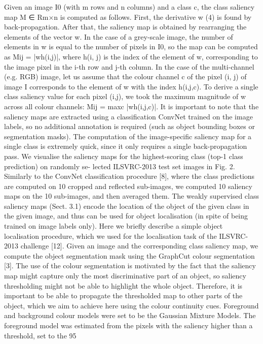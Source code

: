 Given an image I0 (with m rows and n columns) and a class c, the class saliency map M ∈ Rm×n is computed as follows. First, the derivative w (4) is found by back-propagation. After that, the saliency map is obtained by rearranging the elements of the vector w. In the case of a grey-scale image, the number of elements in w is equal to the number of pixels in I0, so the map can be computed as Mij = |wh(i,j)|, where h(i, j) is the index of the element of w, corresponding to the image pixel in the i-th row and j-th column. In the case of the multi-channel (e.g. RGB) image, let us assume that the colour channel c of the pixel (i, j) of image I corresponds to the element of w with the index h(i,j,c). To derive a single class saliency value for each pixel (i,j), we took the maximum magnitude of w across all colour channels: Mij = maxc |wh(i,j,c)|. 
It is important to note that the saliency maps are extracted using a classification ConvNet trained on the image labels, so no additional annotation is required (such as object bounding boxes or segmentation masks). The computation of the image-specific saliency map for a single class is extremely quick, since it only requires a single back-propagation pass. 
We visualise the saliency maps for the highest-scoring class (top-1 class prediction) on randomly se- lected ILSVRC-2013 test set images in Fig. 2. Similarly to the ConvNet classification procedure [8], where the class predictions are computed on 10 cropped and reflected sub-images, we computed 10 saliency maps on the 10 sub-images, and then averaged them. 
The weakly supervised class saliency maps (Sect. 3.1) encode the location of the object of the given class in the given image, and thus can be used for object localisation (in spite of being trained on image labels only). Here we briefly describe a simple object localisation procedure, which we used for the localisation task of the ILSVRC-2013 challenge [12]. 
Given an image and the corresponding class saliency map, we compute the object segmentation mask using the GraphCut colour segmentation [3]. The use of the colour segmentation is motivated by the fact that the saliency map might capture only the most discriminative part of an object, so saliency thresholding might not be able to highlight the whole object. Therefore, it is important to be able to propagate the thresholded map to other parts of the object, which we aim to achieve here using the colour continuity cues. Foreground and background colour models were set to be the Gaussian Mixture Models. The foreground model was estimated from the pixels with the saliency higher than a threshold, set to the 95%
